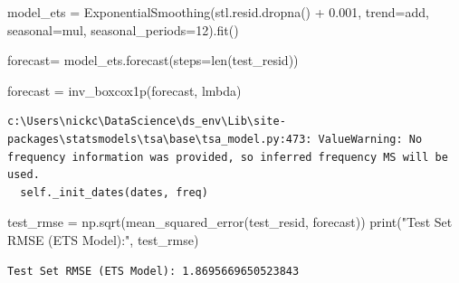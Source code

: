 \documentclass[
  11pt,
]{article}
\newenvironment{Shaded}{\begin{snugshade}}{\end{snugshade}}
\newcommand{\BuiltInTok}[1]{\textcolor[rgb]{0.00,0.23,0.31}{#1}}
\newcommand{\DecValTok}[1]{\textcolor[rgb]{0.68,0.00,0.00}{#1}}
\newcommand{\FloatTok}[1]{\textcolor[rgb]{0.68,0.00,0.00}{#1}}
\newcommand{\NormalTok}[1]{\textcolor[rgb]{0.00,0.23,0.31}{#1}}
\newcommand{\OperatorTok}[1]{\textcolor[rgb]{0.37,0.37,0.37}{#1}}
\newcommand{\StringTok}[1]{\textcolor[rgb]{0.13,0.47,0.30}{#1}}
\begin{document}
\begin{Shaded}
\begin{Highlighting}[]
\NormalTok{model\_ets }\OperatorTok{=}\NormalTok{ ExponentialSmoothing(stl.resid.dropna() }\OperatorTok{+} \FloatTok{0.001}\NormalTok{, trend}\OperatorTok{=}\StringTok{\textquotesingle{}add\textquotesingle{}}\NormalTok{, seasonal}\OperatorTok{=}\StringTok{\textquotesingle{}mul\textquotesingle{}}\NormalTok{, seasonal\_periods}\OperatorTok{=}\DecValTok{12}\NormalTok{).fit()}

\NormalTok{forecast}\OperatorTok{=}\NormalTok{ model\_ets.forecast(steps}\OperatorTok{=}\BuiltInTok{len}\NormalTok{(test\_resid))}

\NormalTok{forecast }\OperatorTok{=}\NormalTok{ inv\_boxcox1p(forecast, lmbda)}
\end{Highlighting}
\end{Shaded}

\begin{verbatim}
c:\Users\nickc\DataScience\ds_env\Lib\site-packages\statsmodels\tsa\base\tsa_model.py:473: ValueWarning: No frequency information was provided, so inferred frequency MS will be used.
  self._init_dates(dates, freq)
\end{verbatim}

\begin{Shaded}
\begin{Highlighting}[]
\NormalTok{test\_rmse }\OperatorTok{=}\NormalTok{ np.sqrt(mean\_squared\_error(test\_resid, forecast))}
\BuiltInTok{print}\NormalTok{(}\StringTok{"Test Set RMSE (ETS Model):"}\NormalTok{, test\_rmse)}
\end{Highlighting}
\end{Shaded}

\begin{verbatim}
Test Set RMSE (ETS Model): 1.8695669650523843
\end{verbatim}
\end{document}
